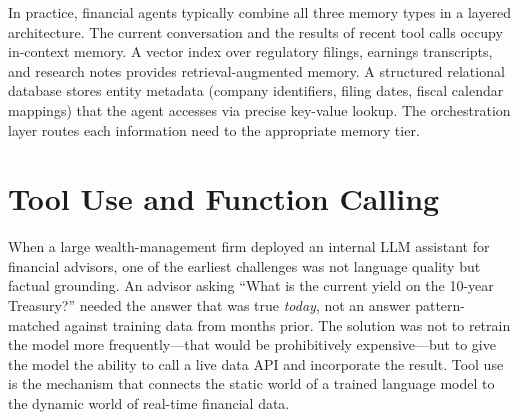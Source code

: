 \begin{deepdive}
In practice, financial agents typically combine all three memory types in a layered
architecture. The current conversation and the results of recent tool calls occupy
in-context memory. A vector index over regulatory filings, earnings transcripts, and
research notes provides retrieval-augmented memory. A structured relational database
stores entity metadata (company identifiers, filing dates, fiscal calendar mappings)
that the agent accesses via precise key-value lookup. The orchestration layer routes each information need to the appropriate memory tier.

\end{deepdive}


\section{Tool Use and Function Calling}
\label{sec:tool-use}

\begin{context}
When a large wealth-management firm deployed an internal LLM assistant for financial advisors, one of
the earliest challenges was not language quality but factual grounding. An advisor
asking ``What is the current yield on the 10-year Treasury?'' needed the answer that
was true \emph{today}, not an answer pattern-matched against training data from months
prior. The solution was not to retrain the model more frequently---that would be
prohibitively expensive---but to give the model the ability to call a live data API
and incorporate the result. Tool use is the mechanism that connects the static world of
a trained language model to the dynamic world of real-time financial data.
\end{context}

